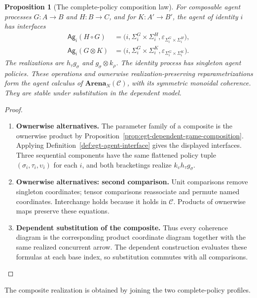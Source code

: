 \documentclass[11pt,a4paper]{article}
\numberwithin{equation}{section}
\newtheorem{proposition}[theorem]{Proposition}
\theoremstyle{definition}
\theoremstyle{remark}
\theoremstyle{plain}
\begin{document}
\begin{proposition}[The complete-policy composition law]
\label{prop:egt-agent-composition}
For composable agent processes $G:A\to B$ and $H:B\to C$, and for
$K:A'\to B'$, the agent of identity $i$ has interfaces
\[
 \begin{aligned}
 \mathsf{Ag}_i(H\circ G)
   &=\bigl(i,\Sigma_i^G\times\Sigma_i^H,
                   \varepsilon_{\Sigma_i^G\times\Sigma_i^H}\bigr),\\
 \mathsf{Ag}_i(G\otimes K)
   &=\bigl(i,\Sigma_i^G\times\Sigma_i^K,
                   \varepsilon_{\Sigma_i^G\times\Sigma_i^K}\bigr).
 \end{aligned}
\]
The realizations are $h_\tau g_\sigma$ and $g_\sigma\otimes k_\rho$.
The identity process has singleton agent policies. These operations and
ownerwise realization-preserving reparametrizations form the agent calculus
of $\mathbf{Arena}_N(\mathcal C)$, with its symmetric monoidal coherence.
They are stable under substitution in the dependent model.
\end{proposition}
\begin{proof}
\leavevmode
\begin{enumerate}[label=\textup{(\arabic*)},leftmargin=*,itemsep=4pt,topsep=3pt]
  \item \textbf{Ownerwise alternatives.} The parameter family of a composite is the ownerwise product by
Proposition~\ref{prop:egt-dependent-game-composition}. Applying
Definition~\ref{def:egt-agent-interface} gives the displayed interfaces. Three sequential components have the same flattened policy tuple
$(\sigma_i,\tau_i,\upsilon_i)$ for each $i$, and both bracketings realize
$k_\upsilon h_\tau g_\sigma$.
  \item \textbf{Ownerwise alternatives: second comparison.} Unit comparisons remove singleton coordinates;
tensor comparisons reassociate and permute named coordinates. Interchange
holds because it holds in $\mathcal C$. Products of ownerwise maps preserve
these equations.
  \item \textbf{Dependent substitution of the composite.} Thus every coherence diagram is the corresponding product
coordinate diagram together with the same realized concurrent arrow. The dependent construction evaluates these formulas at each base index, so
substitution commutes with all comparisons.
\end{enumerate}
\end{proof}

\noindent The composite realization is obtained by joining the two complete-policy profiles.
\begin{center}
\end{center}
\end{document}

